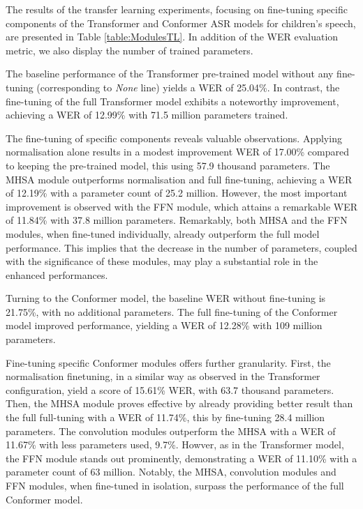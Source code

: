 The results  of the transfer learning experiments, focusing on fine-tuning specific components of the Transformer and Conformer \ac{ASR} models for children's speech, are presented in Table \ref{table:ModulesTL}. In addition of the \ac{WER} evaluation metric, we also display the number of trained parameters. 

The baseline performance of the Transformer pre-trained model without any fine-tuning (corresponding to \textit{None} line) yields a \ac{WER} of 25.04\%. In contrast, the fine-tuning of the full Transformer model exhibits a noteworthy improvement, achieving a \ac{WER} of 12.99\% with 71.5 million parameters trained.

The fine-tuning of specific components reveals valuable observations. Applying normalisation alone results in a modest improvement \ac{WER} of 17.00\% compared to keeping the pre-trained model, this using 57.9 thousand parameters. The \ac{MHSA} module outperforms normalisation and full fine-tuning, achieving a \ac{WER} of 12.19\% with a parameter count of 25.2 million. However, the most important improvement is observed with the \ac{FFN} module, which attains a remarkable \ac{WER} of 11.84\% with 37.8 million parameters. Remarkably, both \ac{MHSA} and the \ac{FFN} modules, when fine-tuned individually, already outperform the full model performance. This implies that the decrease in the number of parameters, coupled with the significance of these modules, may play a substantial role in the enhanced performances.

Turning to the Conformer model, the baseline \ac{WER} without fine-tuning is 21.75\%, with no additional parameters. The full fine-tuning of the Conformer model improved performance, yielding a \ac{WER} of 12.28\% with 109 million parameters.

Fine-tuning specific Conformer modules offers further granularity. First, the normalisation finetuning, in a similar way as observed in the Transformer configuration, yield a score of 15.61\% WER, with 63.7 thousand parameters. Then,  the \ac{MHSA} module proves effective by already providing better result than the full full-tuning with a \ac{WER} of 11.74\%, this by fine-tuning 28.4 million parameters. The convolution modules outperform the \ac{MHSA} with a \ac{WER} of 11.67\% with less parameters used, 9.7\%. Howver, as in the Transformer model, the \ac{FFN} module stands out prominently, demonstrating a \ac{WER} of 11.10\% with a parameter count of 63 million. Notably, the \ac{MHSA}, convolution modules and \ac{FFN} modules, when fine-tuned in isolation, surpass the performance of the full Conformer model.

